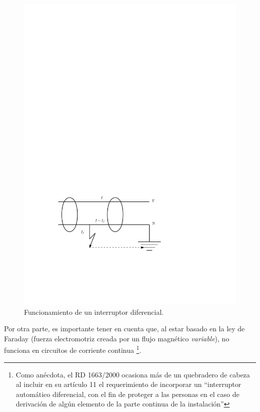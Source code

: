 %
\begin{figure}
\begin{centering}
\includegraphics[scale=0.68]{../figs/InterruptorDiferencial}
\end{centering}

\caption{Funcionamiento de un interruptor diferencial.\label{fig:FuncionamientoDiferencial}}

\end{figure}


Por otra parte, es importante tener en cuenta que, al estar basado
en la ley de Faraday (fuerza electromotriz creada por un flujo magnético
\emph{variable}), no funciona en circuitos de corriente continua%
\footnote{Como anécdota, el RD 1663/2000 \citep{RealDecreto2000} ocasiona más
de un quebradero de cabeza al incluir en su artículo 11 el requerimiento
de incorporar un {}``interruptor automático diferencial, con el fin
de proteger a las personas en el caso de derivación de algún elemento
de la parte continua de la instalación''%
}. 


